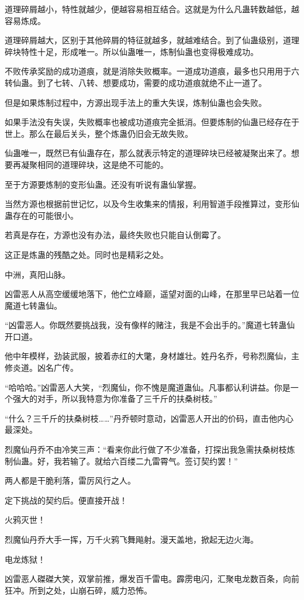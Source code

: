 \begin{this_body}
道理碎屑越小，特性就越少，便越容易相互结合。这就是为什么凡蛊转数越低，越容易炼成。

道理碎屑越大，区别于其他碎屑的特征就越多，就越难结合。到了仙蛊级别，道理碎块特性十足，形成唯一。所以仙蛊唯一，炼制仙蛊也变得极难成功。

不败传承奖励的成功道痕，就是消除失败概率。一道成功道痕，最多也只用用于六转仙蛊。到了七转、八转、想要成功，需要的成功道痕就绝不止一道了。

但是如果炼制过程中，方源出现手法上的重大失误，炼制仙蛊也会失败。

如果手法没有失误，失败概率也被成功道痕完全抵消。但要炼制的仙蛊已经存在于世上。那么在最后关头，整个炼蛊仍旧会无故失败。

仙蛊唯一，既然已有仙蛊存在，那么就表示特定的道理碎块已经被凝聚出来了。想要再凝聚相同的道理碎块，这是绝不可能的。

至于方源要炼制的变形仙蛊。还没有听说有蛊仙掌握。

当然方源也根据前世记忆，以及今生收集来的情报，利用智道手段推算过，变形仙蛊存在的可能很小。

若真是存在，方源也没有办法，最终失败也只能自认倒霉了。

这正是炼蛊的残酷之处。同时也是精彩之处。

中洲，真阳山脉。

凶雷恶人从高空缓缓地落下，他伫立峰巅，遥望对面的山峰，在那里早已站着一位魔道七转蛊仙。

“凶雷恶人。你既然要挑战我，没有像样的赌注，我是不会出手的。”魔道七转蛊仙开口道。

他中年模样，劲装武服，披着赤红的大氅，身材雄壮。姓丹名乔，号称烈魔仙，主修炎道。凶名广传。

“哈哈哈。”凶雷恶人大笑，“烈魔仙，你不愧是魔道蛊仙。凡事都认利讲益。你是一个强大的对手，所以我特意为你准备了三千斤的扶桑树枝。”

“什么？三千斤的扶桑树枝……”丹乔顿时意动，凶雷恶人开出的价码，直击他内心最深处。

烈魔仙丹乔不由冷笑三声：“看来你此行做了不少准备，打探出我急需扶桑树枝炼制仙蛊。好，我若输了。就给六百缕二九雷霄气。签订契约罢！”

两人都是干脆利落，雷厉风行之人。

定下挑战的契约后。便直接开战！

火鸦灭世！

烈魔仙丹乔大手一挥，万千火鸦飞舞飚射。漫天盖地，掀起无边火海。

电龙炼狱！

凶雷恶人磔磔大笑，双掌前推，爆发百千雷电。霹雳电闪，汇聚电龙数百条，向前狂冲。所到之处，山崩石碎，威力恐怖。


\end{this_body}
